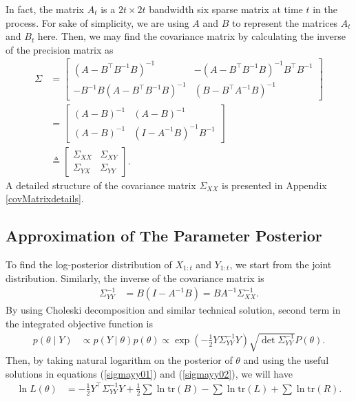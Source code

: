 In fact, the matrix $A_t$ is a $2t \times 2t$ bandwidth six sparse matrix at time $t$ in the process. For sake of simplicity, we are using $A$ and $B$ to represent the matrices  $A_t$ and $B_t$ here. Then, we may find the covariance matrix by calculating the inverse of the precision matrix as 
\begin{align*}
\Sigma &= \begin{bmatrix}
\left(A-B^\top B^{-1}B\right) ^{-1} & -\left(A-B^\top B^{-1}B\right)^{-1}B^\top B^{-1}\\
- B^{-1}B\left(A-B^\top B^{-1}B\right)^{-1} & \left(B-B^\top A^{-1}B\right) ^{-1}
\end{bmatrix} \\
&= \begin{bmatrix}
\left(A-B\right) ^{-1} & \left(A-B\right)^{-1}\\
\left(A-B\right)^{-1} & \left(I- A^{-1}B\right) ^{-1}B^{-1}
\end{bmatrix} \\
&\triangleq \begin{bmatrix}
\Sigma_{XX} & \Sigma_{XY} \\
\Sigma_{YX}  &\Sigma_{YY} 
\end{bmatrix}.
\end{align*}
A detailed structure of the covariance matrix $\Sigma_{XX} $ is presented in Appendix \ref{covMatrixdetails}. 

\subsection{Approximation of The Parameter Posterior}

To find the log-posterior distribution of $X_{1:t}$ and $Y_{1:t}$, we start from the joint distribution. Similarly, the inverse of the covariance matrix is 
\begin{align*}
\Sigma_{YY}^{-1} &= B(I-A^{-1}B)= BA^{-1}\Sigma_{XX}^{-1}.
\end{align*}
By using Choleski decomposition and similar technical solution, second term in the integrated objective function is 
\begin{align*}
p(\theta \mid Y) &\propto p(Y\mid\theta)p(\theta) \propto \exp\left( -\frac{1}{2} Y \Sigma_{YY}^{-1} Y \right) \sqrt{\det \Sigma_{YY}^{-1}} P(\theta).
\end{align*}
Then, by taking natural logarithm on the posterior of $\theta$ and using the useful solutions in equations (\ref{sigmayy01}) and (\ref{sigmayy02}), we will have
\begin{align}\label{logL}
\ln L(\theta) &= -\frac{1}{2}Y^\top\Sigma_{YY}^{-1}Y+\frac{1}{2}\sum\ln\mbox{tr}(B)-\sum\ln\mbox{tr}(L)+\sum\ln\mbox{tr}(R).
\end{align}




